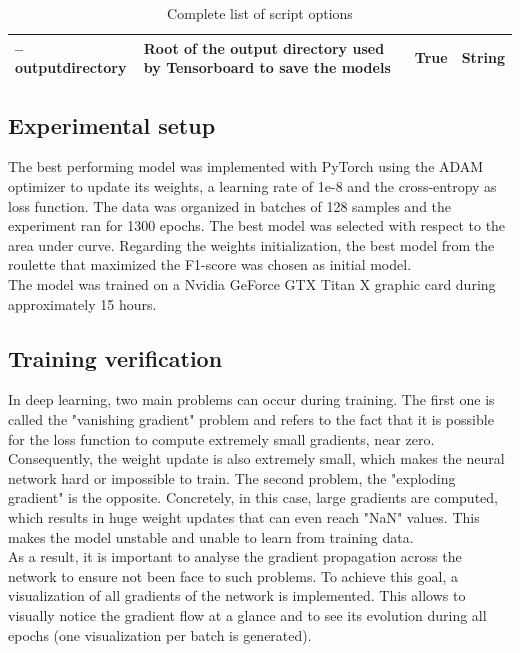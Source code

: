 \begin{table}[]
{\begin{tabular}{|llll|}
\textbf{--outputdirectory}  & Root of the output directory used by Tensorboard to save the models                                                                                                                                                 & True                                                                        & String        \\ \hline
\end{tabular}%
}
\caption{Complete list of script options}
\label{fig:paper_reproduction_options}
\end{table}

\subsection{Experimental setup}
The best performing model was implemented with PyTorch using the ADAM optimizer to update its weights, a learning rate of 1e-8 and the cross-entropy as loss function. The data was organized in batches of 128 samples and the experiment ran for 1300 epochs. The best model was selected with respect to the area under curve. Regarding the weights initialization, the best model from the roulette that maximized the F1-score was chosen as initial model.\\
The model was trained on a Nvidia GeForce GTX Titan X graphic card during approximately 15 hours.

\subsection{Training verification}
In deep learning, two main problems can occur during training. The first one is called the "vanishing gradient" problem and refers to the fact that it is possible for the loss function to compute extremely small gradients, near zero. Consequently, the weight update is also extremely small, which makes the neural network hard or impossible to train. The second problem, the "exploding gradient" is the opposite. Concretely, in this case, large gradients are computed, which results in huge weight updates that can even reach "NaN" values. This makes the model unstable and unable to learn from training data.  \\
As a result, it is important to analyse the gradient propagation across the network to ensure not been face to such problems. To achieve this goal, a visualization of all gradients of the network is implemented. This allows to visually notice the gradient flow at a glance and to see its evolution during all epochs (one visualization per batch is generated).
